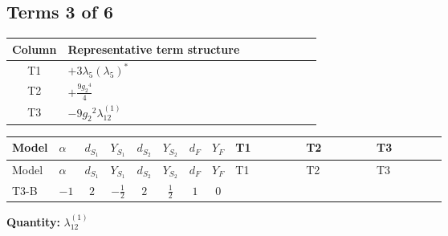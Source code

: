 \documentclass[8pt]{article}
\begin{document}
\begin{landscape}
\subsection*{Terms 3 of 6}
\begin{center}
\begin{tabular}{@{}c >{\raggedright\arraybackslash}p{0.82\linewidth}@{}}
\toprule
Column & Representative term structure \\
\midrule
T1 & \(\displaystyle +3 {\lambda_5} \left({\lambda_5}\right)^{*}\) \\
\midrule
T2 & \(\displaystyle +\frac{9 {g_2}^4}{4}\) \\
\midrule
T3 & \(\displaystyle -9 {g_2}^2 {\lambda_{12}^{(1)}}\) \\
\midrule
\bottomrule
\end{tabular}
\end{center}
\smallskip
\tiny
\begin{longtable}{@{}llcccccc >{\raggedright\arraybackslash}p{0.21\linewidth} >{\raggedright\arraybackslash}p{0.21\linewidth} >{\raggedright\arraybackslash}p{0.21\linewidth}@{}}
\toprule
Model & $\alpha$ & $d_{S_1}$ & $Y_{S_1}$ & $d_{S_2}$ & $Y_{S_2}$ & $d_F$ & $Y_F$ & T1 & T2 & T3 \\
\midrule
\endfirsthead
\toprule
Model & $\alpha$ & $d_{S_1}$ & $Y_{S_1}$ & $d_{S_2}$ & $Y_{S_2}$ & $d_F$ & $Y_F$ & T1 & T2 & T3 \\
\midrule
\endhead
T3-B & $-1$ & $2$ & $-\frac{1}{2}$ & $2$ & $\frac{1}{2}$ & $1$ & $0$ & \scriptsize\adjustbox{max width=\linewidth}{$\begin{gathered} +3 {\lambda_5} \left({\lambda_5}\right)^{*}\end{gathered}$} & \scriptsize\adjustbox{max width=\linewidth}{$\begin{gathered} +\frac{9 {g_2}^4}{4}\end{gathered}$} & \scriptsize\adjustbox{max width=\linewidth}{$\begin{gathered} -9 {g_2}^2 {\lambda_{12}^{(1)}}\end{gathered}$} \\
\midrule
\bottomrule
\end{longtable}
\clearpage
\noindent\textbf{Quantity: }$\lambda_{12}^{(1)}$\par\smallskip

\end{landscape}
\end{document}
